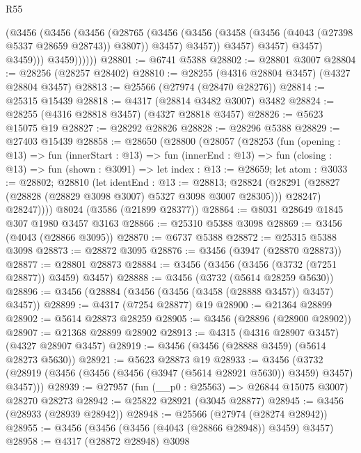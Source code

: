 \begin{lexlean}{R55}
\begin{coremodule}
                      (@3456
                        (@3456
                          (@3456
                            (@28765
                              (@3456
                                (@3456
                                  (@3458 (@3456 (@4043 (@27398 @5337 @28659 @28743)) @3807))
                                  @3457)
                                @3457))
                            @3457)
                          @3457)
                        @3457)
                      @3459)))
                @3459))))))
@28801 := @6741 @5388
@28802 := @28801 @3007
@28804 := @28256 (@28257 @28402)
@28810 := @28255 (@4316 @28804 @3457) (@4327 @28804 @3457)
@28813 := @25566 (@27974 (@28470 @28276))
@28814 := @25315 @15439
@28818 := @4317 (@28814 @3482 @3007) @3482
@28824 := @28255 (@4316 @28818 @3457) (@4327 @28818 @3457)
@28826 := @5623 @15075 @19
@28827 := @28292 @28826
@28828 := @28296 @5388
@28829 := @27403 @15439
@28858 := @28650
    (@28800
      (@28057
        (@28253
          (fun (opening : @13) =>
          fun (innerStart : @13) =>
          fun (innerEnd : @13) =>
          fun (closing : @13) =>
          fun (shown : @3091) =>
          let index : @13 := @28659;
          let atom : @3033 := @28802;
          @28810
            (let identEnd : @13 := @28813;
            @28824 (@28291 (@28827 (@28828 (@28829 @3098 @3007) @5327 @3098 @3007 @28305))) @28247)
            @28247))))
    @8024
    (@3586 (@21899 @28377))
@28864 := @8031 @28649 @1845 @307 @1980 @3457 @3163
@28866 := @25310 @5388 @3098
@28869 := @3456 (@4043 (@28866 @3095))
@28870 := @6737 @5388
@28872 := @25315 @5388 @3098
@28873 := @28872 @3095
@28876 := @3456 (@3947 (@28870 @28873))
@28877 := @28801 @28873
@28884 := @3456 (@3456 (@3456 (@3732 (@7251 @28877)) @3459) @3457)
@28888 := @3456 (@3732 (@5614 @28259 @5630))
@28896 := @3456 (@28884 (@3456 (@3456 (@3458 (@28888 @3457)) @3457) @3457))
@28899 := @4317 (@7254 @28877) @19
@28900 := @21364 @28899
@28902 := @5614 @28873 @28259
@28905 := @3456 (@28896 (@28900 @28902))
@28907 := @21368 @28899 @28902
@28913 := @4315 (@4316 @28907 @3457) (@4327 @28907 @3457)
@28919 := @3456 (@3456 (@28888 @3459) (@5614 @28273 @5630))
@28921 := @5623 @28873 @19
@28933 := @3456
    (@3732 (@28919 (@3456 (@3456 (@3456 (@3947 (@5614 @28921 @5630)) @3459) @3457) @3457)))
@28939 := @27957 (fun (__p0 : @25563) => @26844 @15075 @3007) @28270 @28273
@28942 := @25822 @28921 (@3045 @28877)
@28945 := @3456 (@28933 (@28939 @28942))
@28948 := @25566 (@27974 (@28274 @28942))
@28955 := @3456 (@3456 (@3456 (@4043 (@28866 @28948)) @3459) @3457)
@28958 := @4317 (@28872 @28948) @3098

\end{coremodule}
\end{lexlean}
